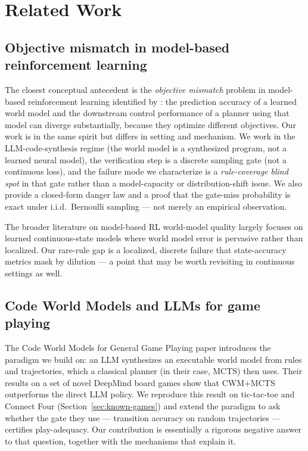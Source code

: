 \documentclass[11pt]{article}
\theoremstyle{remark}
\begin{document}
\section{Related Work}
\label{sec:related}

\subsection{Objective mismatch in model-based reinforcement learning}

The closest conceptual antecedent is the \emph{objective mismatch} problem in model-based reinforcement learning identified by \citet{lambert2020objective}: the prediction accuracy of a learned world model and the downstream control performance of a planner using that model can diverge substantially, because they optimize different objectives. Our work is in the same spirit but differs in setting and mechanism. We work in the LLM-code-synthesis regime (the world model is a synthesized program, not a learned neural model), the verification step is a discrete sampling gate (not a continuous loss), and the failure mode we characterize is a \emph{rule-coverage blind spot} in that gate rather than a model-capacity or distribution-shift issue. We also provide a closed-form danger law and a proof that the gate-miss probability is exact under i.i.d.\ Bernoulli sampling --- not merely an empirical observation.

The broader literature on model-based RL world-model quality \citep[e.g., Dreamer,][]{hafner2020dreamer}\citep[MBPO,][]{janner2019mbpo} largely focuses on learned continuous-state models where world model error is pervasive rather than localized. Our rare-rule gap is a localized, discrete failure that state-accuracy metrics mask by dilution --- a point that may be worth revisiting in continuous settings as well.

\subsection{Code World Models and LLMs for game playing}

The Code World Models for General Game Playing paper \citep{lehrach2025cwm} introduces the paradigm we build on: an LLM synthesizes an executable world model from rules and trajectories, which a classical planner (in their case, MCTS) then uses. Their results on a set of novel DeepMind board games show that CWM+MCTS outperforms the direct LLM policy. We reproduce this result on tic-tac-toe and Connect Four (Section~\ref{sec:known-games}) and extend the paradigm to ask whether the gate they use --- transition accuracy on random trajectories --- certifies play-adequacy. Our contribution is essentially a rigorous negative answer to that question, together with the mechanisms that explain it.
\end{document}
